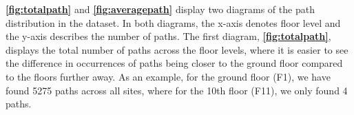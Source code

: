 \begin{figure}[ht]
\begin{minipage}{.45\textwidth}
    \label{fig:averagepath}
    \end{minipage}
\end{figure}



\textbf{\autoref{fig:totalpath}} and \textbf{\autoref{fig:averagepath}} display two diagrams of the path distribution in the dataset. In both diagrams, the x-axis denotes floor level and the y-axis describes the number of paths. The first diagram, \textbf{\autoref{fig:totalpath}}, displays the total number of paths across the floor levels, where it is easier to see the difference in occurrences of paths being closer to the ground floor compared to the floors further away. As an example, for the ground floor (F1), we have found 5275 paths across all sites, where for the 10th floor (F11), we only found 4 paths.

